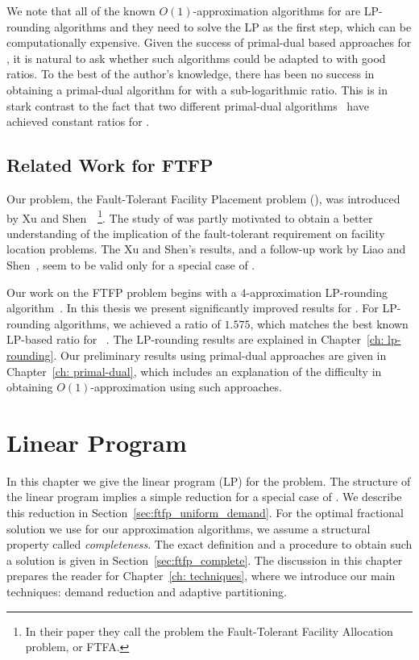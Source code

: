 \documentclass[oneside,final]{ucr}
\begin{document}
We note that all of the known $O(1)$-approximation
algorithms for {\FTFL} are LP-rounding algorithms and they
need to solve the LP as the first step, which can be
computationally expensive. Given the success of primal-dual
based approaches for {\UFL}, it is natural to ask whether
such algorithms could be adapted to {\FTFL} with good
ratios. To the best of the author's knowledge, there has
been no success in obtaining a primal-dual algorithm for
{\FTFL} with a sub-logarithmic ratio. This is in stark
contrast to the fact that two different primal-dual
algorithms~\cite{JainV03,JainMMSV03} have achieved constant
ratios for {\UFL}.

\section{Related Work for FTFP}
Our problem, the Fault-Tolerant Facility Placement problem
(\FTFP), was introduced by Xu and
Shen~\cite{XuS09}~\footnote{In their paper they call the
  problem the Fault-Tolerant Facility Allocation problem, or
  FTFA.}. The study of {\FTFP} was partly motivated to
obtain a better understanding of the implication of the
fault-tolerant requirement on facility location
problems. The Xu and Shen's results, and a follow-up work by
Liao and Shen~\cite{LiaoS11}, seem to be valid only for a
special case of {\FTFP}.

Our work on the FTFP problem begins with a $4$-approximation
LP-rounding algorithm~\cite{YanC11}. In this thesis we
present significantly improved results for {\FTFP}. For
LP-rounding algorithms, we achieved a ratio of $1.575$,
which matches the best known LP-based ratio for
{\UFL}~\cite{ByrkaGS10}. The LP-rounding results are
explained in Chapter~\ref{ch: lp-rounding}. Our preliminary
results using primal-dual approaches are given in
Chapter~\ref{ch: primal-dual}, which includes an explanation
of the difficulty in obtaining $O(1)$-approximation using
such approaches.


\chapter{Linear Program} \label{ch: lp} 

In this chapter we give the linear program (LP) for the
{\FTFP} problem. The structure of the linear program implies
a simple reduction for a special case of {\FTFP}. We
describe this reduction in
Section~\ref{sec:ftfp_uniform_demand}. For the optimal
fractional solution we use for our approximation algorithms,
we assume a structural property called
\emph{completeness}. The exact definition and a procedure to
obtain such a solution is given in
Section~\ref{sec:ftfp_complete}. The discussion in this
chapter prepares the reader for Chapter~\ref{ch:
  techniques}, where we introduce our main techniques:
demand reduction and adaptive partitioning.
\end{document}
